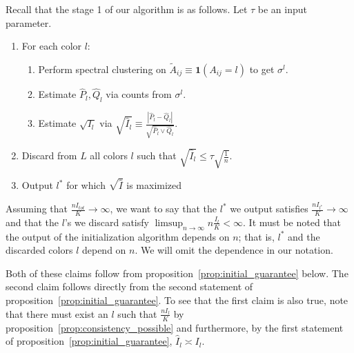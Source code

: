 \documentclass{article}
\begin{document}
Recall that the stage 1 of our algorithm is as follows. Let $\tau$ be an input parameter. 

\begin{enumerate}
\item For each color $l$:
  \begin{enumerate}
   \item Perform spectral clustering on $\tilde{A}_{ij} \equiv \mathbf{1}(A_{ij} = l)$ to get $\sigma^l$. 
   \item Estimate $\hat{P}_l, \hat{Q}_l$ via counts from $\sigma^l$. 
   \item Estimate $\sqrt{I_l}$ via 
  $\sqrt{ \hat{I}_l } \equiv \frac{| \hat{P}_l - \hat{Q}_l |}{\sqrt{ \hat{P}_l \vee \hat{Q}_l}}$. 
   \end{enumerate}
\item Discard from $L$ all colors $l$ such that $\sqrt{\hat{I}_l} \leq \tau \sqrt{ \frac{1}{n}}$.
\item Output $l^*$ for which $\sqrt{\hat{I}}$ is maximized
\end{enumerate}

Assuming that $ \frac{n I_{tot}}{K} \rightarrow \infty$, we want to say that the $l^*$ we output satisfies $\frac{n I_{l^*}}{K} \rightarrow \infty $ and that the $l$'s we discard satisfy $\limsup_{n \rightarrow \infty} n \frac{I_l}{K} < \infty$. It must be noted that the output of the initialization algorithm depends on $n$; that is, $l^*$ and the discarded colors $l$ depend on $n$. We will omit the dependence in our notation. 


Both of these claims follow from proposition~\ref{prop:initial_guarantee} below. The second claim follows directly from the second statement of proposition~\ref{prop:initial_guarantee}. To see that the first claim is also true, note that there must exist an $l$ such that $\frac{n I_l}{K}$ by proposition~\ref{prop:consistency_possible} and furthermore, by the first statement of proposition~\ref{prop:initial_guarantee}, $\hat{I}_{l} \asymp I_{l}$. 
\end{document}
